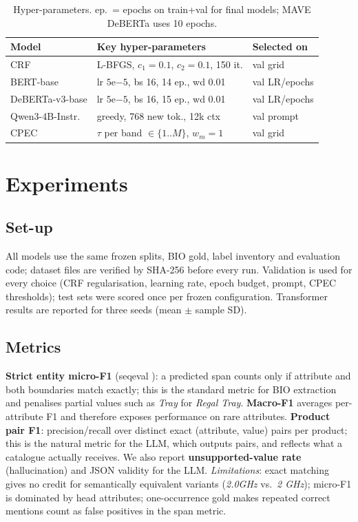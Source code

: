 \documentclass[10pt,twocolumn,a4paper]{article}
\begin{document}
\begin{table}[t]\centering\small
\begin{tabular}{lll}\toprule
Model & Key hyper-parameters & Selected on \\\midrule
CRF & L-BFGS, $c_1{=}0.1$, $c_2{=}0.1$, 150 it. & val grid \\
BERT-base & lr $5\mathrm{e}{-5}$, bs 16, 14 ep., wd 0.01 & val LR/epochs \\
DeBERTa-v3-base & lr $5\mathrm{e}{-5}$, bs 16, 15 ep., wd 0.01 & val LR/epochs \\
Qwen3-4B-Instr. & greedy, 768 new tok., 12k ctx & val prompt \\
CPEC & $\tau$ per band $\in\{1..M\}$, $w_m{=}1$ & val grid \\\bottomrule
\end{tabular}
\caption{Hyper-parameters. ep.\ = epochs on train+val for final models; MAVE DeBERTa uses 10 epochs.}\label{tab:hp}
\end{table}
\section{Experiments}
\subsection{Set-up}
All models use the same frozen splits, BIO gold, label inventory and evaluation code; dataset files are verified by SHA-256 before every run. Validation is used for every choice (CRF regularisation, learning rate, epoch budget, prompt, CPEC thresholds); test sets were scored once per frozen configuration. Transformer results are reported for three seeds (mean $\pm$ sample SD).

\subsection{Metrics}
\textbf{Strict entity micro-F1} (seqeval \cite{nakayama2018}): a predicted span counts only if attribute and both boundaries match exactly; this is the standard metric for BIO extraction and penalises partial values such as \emph{Tray} for \emph{Regal Tray}. \textbf{Macro-F1} averages per-attribute F1 and therefore exposes performance on rare attributes. \textbf{Product pair F1}: precision/recall over distinct exact (attribute, value) pairs per product; this is the natural metric for the LLM, which outputs pairs, and reflects what a catalogue actually receives. We also report \textbf{unsupported-value rate} (hallucination) and JSON validity for the LLM. \emph{Limitations}: exact matching gives no credit for semantically equivalent variants (\emph{2.0GHz} vs.\ \emph{2 GHz}); micro-F1 is dominated by head attributes; one-occurrence gold makes repeated correct mentions count as false positives in the span metric.
\end{document}
